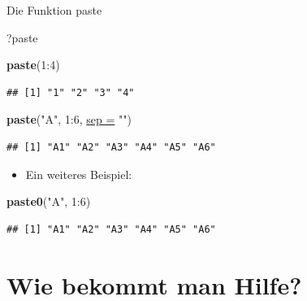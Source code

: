 \documentclass[
  ignorenonframetext,
]{beamer}
\newenvironment{Shaded}{\begin{snugshade}}{\end{snugshade}}
\newcommand{\DataTypeTok}[1]{\textcolor[rgb]{0.74,0.68,0.62}{\underline{#1}}}
\newcommand{\DecValTok}[1]{\textcolor[rgb]{0.27,0.67,0.26}{#1}}
\newcommand{\KeywordTok}[1]{\textcolor[rgb]{0.26,0.66,0.93}{\textbf{#1}}}
\newcommand{\NormalTok}[1]{\textcolor[rgb]{0.74,0.68,0.62}{#1}}
\newcommand{\OperatorTok}[1]{\textcolor[rgb]{0.74,0.68,0.62}{#1}}
\newcommand{\StringTok}[1]{\textcolor[rgb]{0.02,0.61,0.04}{#1}}
\providecommand{\tightlist}{%
  \setlength{\itemsep}{0pt}\setlength{\parskip}{0pt}}
\begin{document}
\begin{frame}[fragile]{Die Funktion paste}
\protect\hypertarget{die-funktion-paste}{}

\begin{Shaded}
\begin{Highlighting}[]
\NormalTok{?paste}
\end{Highlighting}
\end{Shaded}

\begin{Shaded}
\begin{Highlighting}[]
\KeywordTok{paste}\NormalTok{(}\DecValTok{1}\OperatorTok{:}\DecValTok{4}\NormalTok{)}
\end{Highlighting}
\end{Shaded}

\begin{verbatim}
## [1] "1" "2" "3" "4"
\end{verbatim}

\begin{Shaded}
\begin{Highlighting}[]
\KeywordTok{paste}\NormalTok{(}\StringTok{"A"}\NormalTok{, }\DecValTok{1}\OperatorTok{:}\DecValTok{6}\NormalTok{, }\DataTypeTok{sep =} \StringTok{""}\NormalTok{)}
\end{Highlighting}
\end{Shaded}

\begin{verbatim}
## [1] "A1" "A2" "A3" "A4" "A5" "A6"
\end{verbatim}

\begin{itemize}
\tightlist
\item
  Ein weiteres Beispiel:
\end{itemize}

\begin{Shaded}
\begin{Highlighting}[]
\KeywordTok{paste0}\NormalTok{(}\StringTok{"A"}\NormalTok{, }\DecValTok{1}\OperatorTok{:}\DecValTok{6}\NormalTok{)}
\end{Highlighting}
\end{Shaded}

\begin{verbatim}
## [1] "A1" "A2" "A3" "A4" "A5" "A6"
\end{verbatim}

\end{frame}

\hypertarget{wie-bekommt-man-hilfe}{%
\section{Wie bekommt man Hilfe?}\label{wie-bekommt-man-hilfe}}
\end{document}
